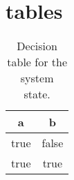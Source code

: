\chapter{tables}


\begin{table}[h]
\centering
\begin{tabular}{|c|c|}
\hline
a & b \\
\hline
\hline
true & false \\ \hline
true & true \\ \hline
\end{tabular}
\caption{\label{system_state_table}Decision table for the system state.}
\end{table}

